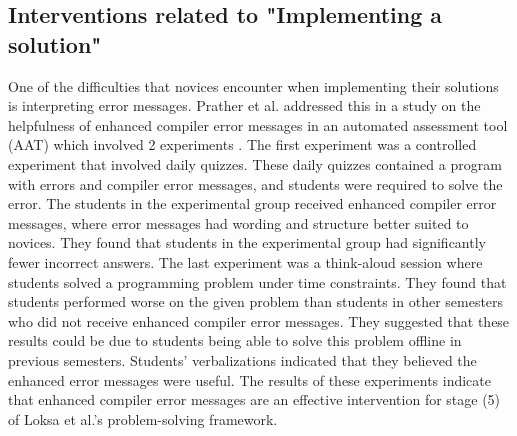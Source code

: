 \documentclass[sigconf,authorversion,nonacm]{acmart}
\begin{document}
\subsection{Interventions related to "Implementing a solution"}
One of the difficulties that novices encounter when implementing their solutions is interpreting error messages. Prather et al. addressed this in  a study on the helpfulness of enhanced compiler error messages in an automated assessment tool (AAT) which involved 2 experiments \cite{prather2017}. The first experiment was a controlled experiment that involved daily quizzes. These daily quizzes contained a program with errors and compiler error messages, and students were required to solve the error. The students in the experimental group received enhanced compiler error messages, where error messages had wording and structure better suited to novices. They found that students in the experimental group had significantly fewer incorrect answers. The last experiment was a think-aloud session where students solved a programming problem under time constraints. They found that students performed worse on the given problem than students in other semesters who did not receive enhanced compiler error messages. They suggested that these results could be due to students being able to solve this problem offline in previous semesters. Students’ verbalizations indicated that they believed the enhanced error messages were useful. The results of these experiments indicate that enhanced compiler error messages are an effective intervention for stage (5) of Loksa et al.’s problem-solving framework.
\end{document}
